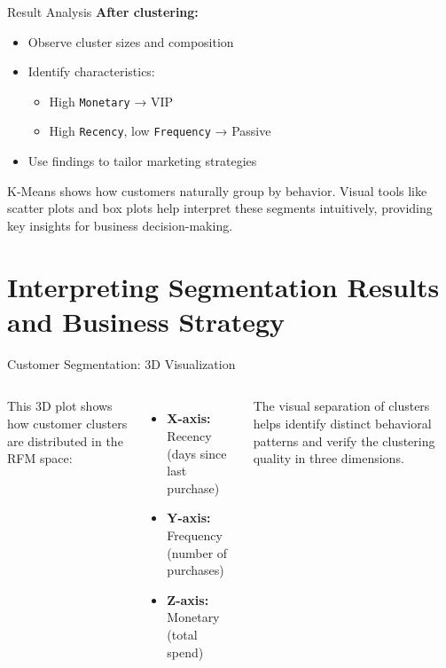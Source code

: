 \documentclass[aspectratio=169, table]{beamer}
\begin{document}
\begin{frame}{Result Analysis}
	\textbf{After clustering:}
	
	\begin{itemize}
		\item Observe cluster sizes and composition
		\item Identify characteristics:
		\begin{itemize}
			\item High \texttt{Monetary} → VIP
			\item High \texttt{Recency}, low \texttt{Frequency} → Passive
		\end{itemize}
		\item Use findings to tailor marketing strategies
	\end{itemize}
	
	K-Means shows how customers naturally group by behavior. Visual tools like scatter plots and box plots help interpret these segments intuitively, providing key insights for business decision-making.
\end{frame}

\section{Interpreting Segmentation Results and Business Strategy}

\begin{frame}{Customer Segmentation: 3D Visualization}
	\vspace{20pt}
	\begin{columns}[c]
		\small
		This 3D plot shows how customer clusters are distributed in the RFM space:
		\begin{itemize}
			\item \textbf{X-axis:} Recency (days since last purchase)
			\item \textbf{Y-axis:} Frequency (number of purchases)
			\item \textbf{Z-axis:} Monetary (total spend)
		\end{itemize}
		\vspace{4pt}
		The visual separation of clusters helps identify distinct behavioral patterns and verify the clustering quality in three dimensions.
		
		\centering
	\end{columns}
\end{frame}
\end{document}
